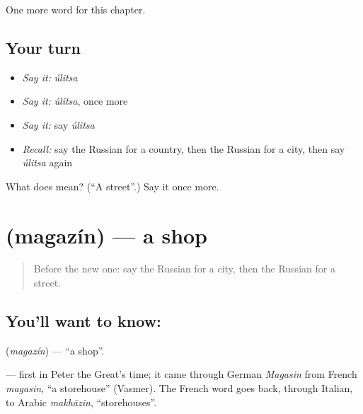 \begin{grammarlens}[title={What you've built}]
One more word for this chapter.
\end{grammarlens}

\subsection*{Your turn}
\begin{itemize}
\raggedright
  \item \emph{Say it:} \emph{úlitsa}
  \item \emph{Say it:} \emph{úlitsa}, once more
  \item \emph{Say it:} say \emph{úlitsa}
  \item \emph{Recall:} say the Russian for a country, then the Russian for a city, then say \emph{úlitsa} again
\end{itemize}

\begin{tcolorbox}[breakable,colback=teal!4,colframe=teal!35!black,title={Before you move on}]
What does  mean? (\textquotedblleft{}A street\textquotedblright{}.) Say it once more.
\end{tcolorbox}
\section[\texorpdfstring{\ru{магазин} (magazín)}{магазин (magazín)}]{ (magazín) — a shop}

\label{lesson:RU-C77-shop}



\begin{quote}
Before the new one: say the Russian for a city, then the Russian for a street.
\end{quote}

\subsection*{You'll want to know: }
\textbf{} (\emph{magazín}) — \textquotedblleft{}a shop\textquotedblright{}.

\begin{cousinweb}
\textbf{} — first in Peter the Great's time; it came through German \emph{Magasin} from French \emph{magasin}, \textquotedblleft{}a storehouse\textquotedblright{} (Vasmer). The French word goes back, through Italian, to Arabic \emph{makhāzin}, \textquotedblleft{}storehouses\textquotedblright{}.
\end{cousinweb}

